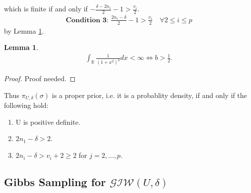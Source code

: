 \documentclass[12pt, leqno]{article}
\newtheorem{lemma}{Lemma}[]
\begin{document}
which is finite if and only if  $-\frac{\delta-2n_i}{2}-1> \frac{v_i}{2}$.
\begin{align*}
\textbf{Condition 3: } \frac{2n_i - \delta}{2}-1> \frac{v_i}{2} \quad
  \forall 2 \leq i \leq p
\end{align*}
by Lemma \ref{hypergeomfunc}.
\begin{lemma} \label{hypergeomfunc}
\begin{align*}
\int_{\mathbb{R}} \frac{1}{(1+x^2)^b} dx < \infty \iff  b> \frac{1}{2}.
\end{align*}
\end{lemma}
\begin{proof} 
Proof needed.
\end{proof}
Thus $\pi_{U,\delta}(\sigma)$ is a proper prior, i.e. it is a
probablity density, if and only if the following hold:
\begin{enumerate}
\item U is positive definite.
\item $2n_1 -\delta >2$.
\item $2n_i - \delta> v_i +2 \geq 2$ for $j = 2,...,p$.
\end{enumerate}

\subsection{Gibbs Sampling for $\mathcal{GIW}(U,\delta)$}
\end{document}
